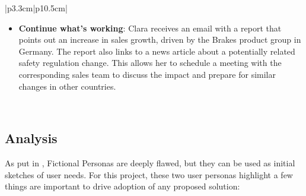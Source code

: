 \documentclass[a4paper]{report}
\begin{document}
\begin{tabular}{|p{3.3cm}|p{10.5cm}|}
\begin{minipage}[t]{\linewidth}
\begin{itemize}
        \item \textbf{Continue what's working}: Clara receives an email with a report that points out an increase in sales growth, driven by the Brakes product group in Germany. The report also links to a news article about a potentially related safety regulation change. This allows her to schedule a meeting with the corresponding sales team to discuss the impact and prepare for similar changes in other countries.
    \end{itemize}
    \vspace{0.05em}
\end{minipage} \\
\hline
\end{tabular}

\subsection{Analysis}

As put in \cite{ixdf_personas_2025}, Fictional Personas are deeply flawed, but they can be used as initial sketches of user needs. For this project, these two user personas highlight a few things are important to drive adoption of any proposed solution:
\end{document}
